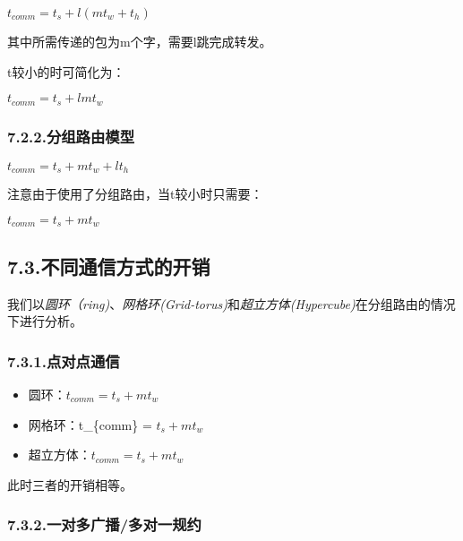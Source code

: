 \documentclass{article}
\begin{document}
\noindent{}$t_{comm} = t_s +l(mt_w+t_h)$%

其中所需传递的包为m个字，需要l跳完成转发。%

t较小的时可简化为：%

$t_{comm} = t_s + lmt_w$%

\subsubsection{7.2.2.\hspace*{0.5em}分组路由模型}\label{section}%

\noindent{}$t_{comm} = t_s + mt_w+ lt_h$%

注意由于使用了分组路由，当t较小时只需要：%

$t_{comm} = t_s + mt_w$%

\subsection{7.3.\hspace*{0.5em}不同通信方式的开销}\label{section}%

\noindent{}我们以\emph{圆环（ring)}、\emph{网格环(Grid-torus)}和\emph{超立方体(Hypercube)}在分组路由的情况下进行分析。%

\subsubsection{7.3.1.\hspace*{0.5em}点对点通信}\label{section}%

\begin{itemize}[noitemsep,topsep=\mdcompacttopsep]%

\item{}圆环：$t_{comm} = t_s + mt_w$%

\item{}网格环：t\_\{comm\} = $t_s + mt_w$%

\item{}超立方体：$t_{comm} = t_s + mt_w$%
\end{itemize}%

\noindent{}此时三者的开销相等。%

\subsubsection{7.3.2.\hspace*{0.5em}一对多广播/多对一规约}\label{section}%
\end{document}
